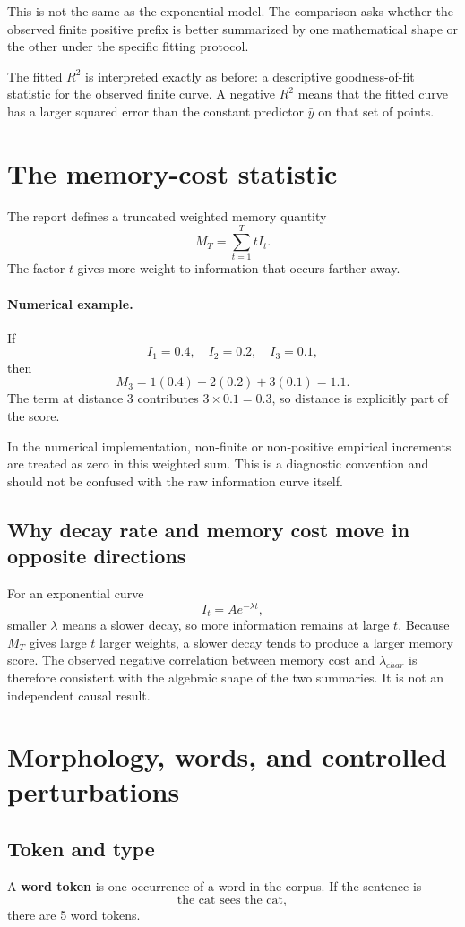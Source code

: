 \documentclass[11pt]{article}
\begin{document}
This is not the same as the exponential model. The comparison asks whether the observed finite positive prefix is better summarized by one mathematical shape or the other under the specific fitting protocol.

The fitted $R^2$ is interpreted exactly as before: a descriptive goodness-of-fit statistic for the observed finite curve. A negative $R^2$ means that the fitted curve has a larger squared error than the constant predictor $\bar y$ on that set of points.

\newpage
\section{The memory-cost statistic}
The report defines a truncated weighted memory quantity
\[
\boxed{M_T=\sum_{t=1}^{T}tI_t.}
\]
The factor $t$ gives more weight to information that occurs farther away.

\paragraph{Numerical example.}
If
\[
I_1=0.4,\quad I_2=0.2,\quad I_3=0.1,
\]
then
\[
M_3=1(0.4)+2(0.2)+3(0.1)=1.1.
\]
The term at distance 3 contributes $3\times0.1=0.3$, so distance is explicitly part of the score.

In the numerical implementation, non-finite or non-positive empirical increments are treated as zero in this weighted sum. This is a diagnostic convention and should not be confused with the raw information curve itself.

\subsection{Why decay rate and memory cost move in opposite directions}
For an exponential curve
\[
I_t=Ae^{-\lambda t},
\]
smaller $\lambda$ means a slower decay, so more information remains at large $t$. Because $M_T$ gives large $t$ larger weights, a slower decay tends to produce a larger memory score. The observed negative correlation between memory cost and $\lambda_{char}$ is therefore consistent with the algebraic shape of the two summaries. It is not an independent causal result.

\newpage
\section{Morphology, words, and controlled perturbations}

\subsection{Token and type}
A \textbf{word token} is one occurrence of a word in the corpus. If the sentence is
\[
\text{the cat sees the cat},
\]
there are 5 word tokens.
\end{document}
